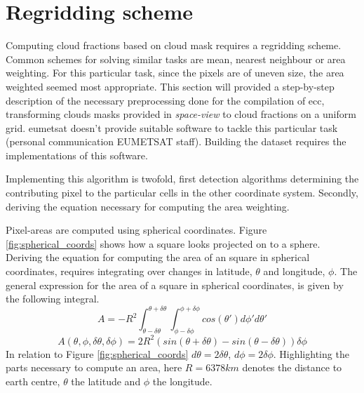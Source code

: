 \section{Regridding scheme} \label{sec:remapping}

Computing cloud fractions based on cloud mask requires a regridding scheme. Common schemes for solving similar tasks are mean, nearest neighbour or area weighting. For this particular task, since the pixels are of uneven size, the area weighted seemed most appropriate. This section will provided a step-by-step description of the necessary preprocessing done for the compilation of \acrshort{ecc}, transforming clouds masks provided in \textit{space-view} to cloud fractions on a uniform grid. \acrshort{eumetsat} doesn't provide suitable software to tackle this particular task (personal communication EUMETSAT staff). Building the dataset requires the implementations of this software.

Implementing this algorithm is twofold, first detection algorithms determining the contributing pixel to the particular cells in the other coordinate system. Secondly,  deriving the equation necessary for computing the area weighting. 

Pixel-areas are computed using spherical coordinates. Figure \ref{fig:spherical_coords} shows how a square looks projected on to a sphere. Deriving the equation for computing the area of an square in spherical coordinates, requires integrating over changes in latitude, $\theta$ and longitude, $\phi$. The general expression for the area of a square in spherical coordinates, is given by the following integral. 
\begin{equation} \label{eq:sphere_integral}
    A = -R^2\int_{ \theta - \delta \theta }^{\theta + \delta \theta} \int_{ \phi - \delta \phi }^{\phi + \delta \phi} cos\left( \theta' \right) d\phi' d\theta'
\end{equation}
\begin{equation} \label{eq:sphere_finish}
    A \left( \theta, \phi, \delta \theta, \delta \phi   \right)= 2R^2 \left( sin\left( \theta + \delta \theta  \right) - sin\left(  \theta - \delta \theta  \right) \right) \delta \phi
\end{equation}
In relation to Figure \ref{fig:spherical_coords} $d \theta = 2 \delta \theta$, $d \phi = 2 \delta \phi$. Highlighting the parts necessary to compute an area, here $R=6378km$ denotes the distance to earth centre, $\theta$ the latitude and $\phi$ the longitude.

